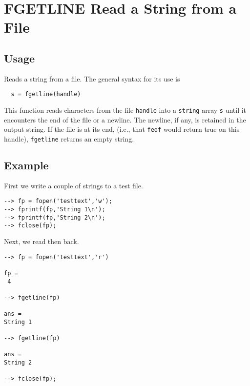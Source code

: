\section{FGETLINE Read a String from a File}

\subsection{Usage}

Reads a string from a file.  The general syntax for its use
is
\begin{verbatim}
  s = fgetline(handle)
\end{verbatim}
This function reads characters from the file \verb|handle| into
a \verb|string| array \verb|s| until it encounters the end of the file
or a newline.  The newline, if any, is retained in the output
string.  If the file is at its end, (i.e., that \verb|feof| would
return true on this handle), \verb|fgetline| returns an empty
string.
\subsection{Example}

First we write a couple of strings to a test file.
\begin{verbatim}
--> fp = fopen('testtext','w');
--> fprintf(fp,'String 1\n');
--> fprintf(fp,'String 2\n');
--> fclose(fp);
\end{verbatim}
Next, we read then back.
\begin{verbatim}
--> fp = fopen('testtext','r')

fp = 
 4 

--> fgetline(fp)

ans = 
String 1

--> fgetline(fp)

ans = 
String 2

--> fclose(fp);
\end{verbatim}
